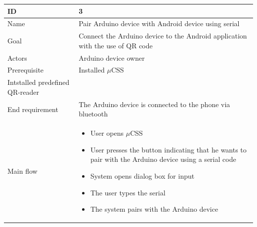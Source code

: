 \begin{table}
    \begin{tabular}{|l|l|}
        \hline
        ID               & 3                                                                                                                                                                                                                                             \\ \hline
        Name             & Pair Arduino device with Android device using serial                                                                                                                                                                                          \\ 
        Goal             & Connect the Arduino device to the Android application with the use of QR code                                                                                                                                                                 \\ 
        Actors           & Arduino device owner     								             \\ 
        Prerequisite     &     Installed $\mu$CSS \\     Intstalled predefined QR-reader                                                                                                                                                                                 \\ 
        End requirement  & The Arduino device is connected to the phone via bluetooth                                                                                                                                                                                    \\ 
        Main flow        & \begin{itemize}
        \item{User opens $\mu$CSS} 
        \item{User presses the button indicating that he wants to pair with the Arduino device using a serial code} 
        \item{System opens dialog box for input} 
        \item{The user types the serial} 
        \item{The system pairs with the Arduino device}
        \end{itemize} \\
 

\end{tabular}
\end{table}
